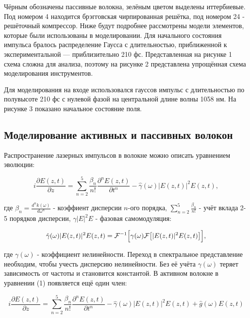\documentclass[12pt]{article}
\begin{document}
Чёрным обозначены пассивные волокна, зелёным цветом выделены иттербиевые. Под номером 4 находится брэгговская
чирпированная решётка, под номером 24 - решёточный компрессор. Ниже будут подробнее рассмотрены модели элементов,
которые были использованы в моделировании. Для начального состояния импульса бралось распределение Гаусса с
длительностью, приближенной к экспериментальной — приблизительно 210 фс. Представленная на рисунке 1 схема сложна для
анализа, поэтому на рисунке 2 представлена упрощённая схема моделирования инструментов.

Для моделирования на входе использовался гауссов импульс с длительностью по полувысоте 210 фс с нулевой фазой
на центральной длине волны 1058 нм. На рисунке 3 показано начальное состояние поля.

\subsection{Моделирование активных и пассивных волокон}

Распространение лазерных импульсов в волокне можно описать уравнением эволюции:

\begin{equation}
    i \frac{\partial E(z, t)}{\partial z} = \sum_{n=2}^{5} \frac{\beta_n}{n!} \frac{\partial^n E(z, t)}{\partial t^n} - \hat{\gamma}(\omega) |E(z, t)|^2 E(z, t),
\end{equation}

где $\beta_n = \frac{d^n k(\omega)}{d \omega^n}$ - коэффиент дисперсии $n$-ого порядка, $\sum_{n=2}^{5} \frac{\beta_n}{n!}$ - учёт
вклада 2-5 порядков дисперсии, $\hat{\gamma} |E|^2 E$ - фазовая самомодуляция:

\begin{equation}
    \hat{\gamma}(\omega) |E(z, t)|^2 E(z, t) = \mathcal{F}^{-1} \Bigl[ \gamma(\omega)\mathcal{F} \bigr[ |E(z, t)|^2 E(z, t) \bigr] \Bigr],
\end{equation}

где $\gamma(\omega)$ - коэффициент нелинейности. Переход в спектральное представление необходим, чтобы учесть дисперсию
нелинейности. Без её учёта $\gamma(\omega)$ теряет зависимость от частоты и становится константой. В активном волокне в уравнении
(1) появляется ещё один член:

\begin{equation}
    i \frac{\partial E(z, t)}{\partial z} = \sum_{n=2}^{5} \frac{\beta_n}{n!} \frac{\partial^n E(z, t)}{\partial t^n} - \hat{\gamma}(\omega) |E(z, t)|^2 E(z, t) +
    \hat{g}(\omega)E(z, t)
\end{equation}
\end{document}
